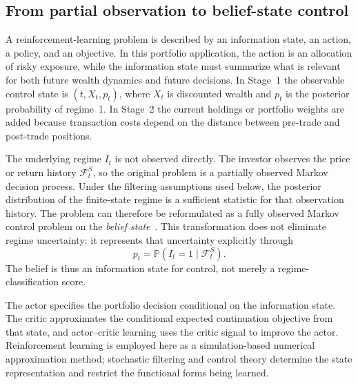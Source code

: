 \documentclass[a4paper,10pt]{article}
\newcommand{\Pbb}{\mathbb{P}}
\newcommand{\F}{\mathcal{F}}
\begin{document}
\subsection{From partial observation to belief-state control}

A reinforcement-learning problem is described by an information state, an action, a policy, and an objective. In this portfolio application, the action is an allocation of risky exposure, while the information state must summarize what is relevant for both future wealth dynamics and future decisions. In Stage~1 the observable control state is $(t,X_t,p_t)$, where $X_t$ is discounted wealth and $p_t$ is the posterior probability of regime~1. In Stage~2 the current holdings or portfolio weights are added because transaction costs depend on the distance between pre-trade and post-trade positions.

The underlying regime $I_t$ is not observed directly. The investor observes the price or return history $\F_t^S$, so the original problem is a partially observed Markov decision process. Under the filtering assumptions used below, the posterior distribution of the finite-state regime is a sufficient statistic for that observation history. The problem can therefore be reformulated as a fully observed Markov control problem on the \emph{belief state}~\cite{krishnamurthy2016}. This transformation does not eliminate regime uncertainty: it represents that uncertainty explicitly through
\begin{equation}
p_t=\Pbb(I_t=1\mid\F_t^S).
\end{equation}
The belief is thus an information state for control, not merely a regime-classification score.

The actor specifies the portfolio decision conditional on the information state. The critic approximates the conditional expected continuation objective from that state, and actor--critic learning uses the critic signal to improve the actor. Reinforcement learning is employed here as a simulation-based numerical approximation method; stochastic filtering and control theory determine the state representation and restrict the functional forms being learned.
\end{document}
